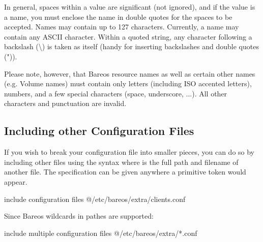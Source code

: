 In general, spaces within a value are significant (not ignored), and if the
value is a name, you must enclose the name in double quotes for the spaces to
be accepted. Names may contain up to 127 characters. Currently, a name may
contain any ASCII character. Within a quoted string, any character following a
backslash (\textbackslash{}) is taken as itself (handy for inserting
backslashes and double quotes (")).

Please note, however, that Bareos resource names as well as certain other
names (e.g. Volume names) must contain only letters (including ISO accented
letters), numbers, and a few special characters (space, underscore, ...).
All other characters and punctuation are invalid.

\subsection{Including other Configuration Files}
\label{Includes}

If you wish to break your configuration file into smaller pieces, you can do
so by including other files using the syntax 
where  is the full path and filename of another file.
The 
specification can be given anywhere a primitive token would appear.

\begin{bconfig}{include configuration files}
@/etc/bareos/extra/clients.conf
\end{bconfig}

Since Bareos  wildcards in pathes are supported:
\begin{bconfig}{include multiple configuration files}
@/etc/bareos/extra/*.conf
\end{bconfig}


